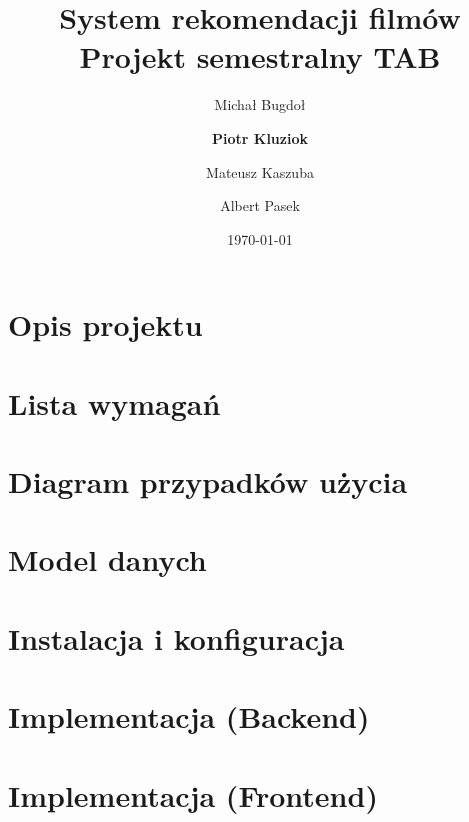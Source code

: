 \documentclass[12pt]{article}
\begin{document}
\title{
{System rekomendacji filmów}\\
{\large Projekt semestralny TAB}\\
}
\author{
	Michał Bugdoł
	\and
	\textbf{Piotr Kluziok}
	\and
	Mateusz Kaszuba
	\and
	Albert Pasek
}
\date{\today}

\maketitle
\newpage

\tableofcontents
\newpage

\section{Opis projektu}


\section{Lista wymagań}


\section{Diagram przypadków użycia}


\section{Model danych}


\section{Instalacja i konfiguracja}


\section{Implementacja (Backend)}


\section{Implementacja (Frontend)}

\end{document}
